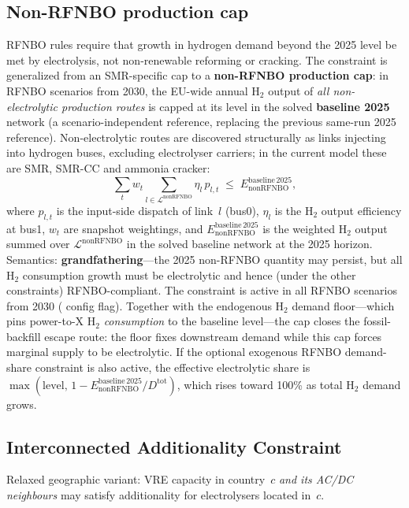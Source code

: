 \documentclass{article}
\newcommand{\code}[1]{{\ttfamily\seqsplit{#1}}}
\begin{document}
\subsection*{Non-RFNBO production cap}
RFNBO rules require that growth in hydrogen demand beyond the 2025 level be met by electrolysis, not non-renewable reforming or cracking. The constraint is generalized from an SMR-specific cap to a \textbf{non-RFNBO production cap}: in RFNBO scenarios from 2030, the EU-wide annual H$_2$ output of \emph{all non-electrolytic production routes} is capped at its level in the solved \textbf{baseline 2025} network (a scenario-independent reference, replacing the previous same-run 2025 reference). Non-electrolytic routes are discovered structurally as links injecting into hydrogen buses, excluding electrolyser carriers; in the current model these are SMR, SMR-CC and ammonia cracker:
\[
\sum_t w_t \sum_{l \in \mathcal{L}^{\mathrm{nonRFNBO}}} \eta_l\, p_{l,t}
\;\le\;
E^{\mathrm{baseline\,2025}}_{\mathrm{nonRFNBO}},
\]
where $p_{l,t}$ is the input-side dispatch of link~$l$ (bus0), $\eta_l$ is the H$_2$ output efficiency at bus1, $w_t$ are snapshot weightings, and $E^{\mathrm{baseline\,2025}}_{\mathrm{nonRFNBO}}$ is the weighted H$_2$ output summed over $\mathcal{L}^{\mathrm{nonRFNBO}}$ in the solved baseline network at the 2025 horizon. Semantics: \textbf{grandfathering}---the 2025 non-RFNBO quantity may persist, but all H$_2$ consumption growth must be electrolytic and hence (under the other constraints) RFNBO-compliant. The constraint is active in all RFNBO scenarios from 2030 (\code{non\_rfnbo\_production\_cap} config flag). Together with the endogenous H$_2$ demand floor---which pins power-to-X H$_2$ \emph{consumption} to the baseline level---the cap closes the fossil-backfill escape route: the floor fixes downstream demand while this cap forces marginal supply to be electrolytic. If the optional exogenous RFNBO demand-share constraint is also active, the effective electrolytic share is $\max(\mathrm{level},\, 1 - E^{\mathrm{baseline\,2025}}_{\mathrm{nonRFNBO}}/D^{\mathrm{tot}})$, which rises toward 100\% as total H$_2$ demand grows.

\subsection*{Interconnected Additionality Constraint}
Relaxed geographic variant: VRE capacity in country~$c$ \emph{and its AC/DC neighbours} may satisfy additionality for electrolysers located in~$c$.
\end{document}
